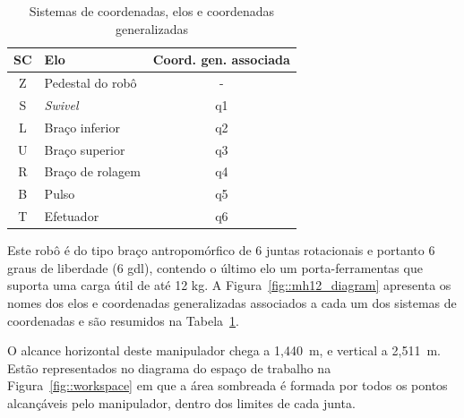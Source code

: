\begin{table}[h]
\centering
\caption{Sistemas de coordenadas, elos e coordenadas generalizadas}
\label{tab::resumo_mh12}
\begin{tabular}{@{}clc@{}}
\toprule
SC & Elo              & \multicolumn{1}{l}{Coord. gen. associada} \\ \midrule
Z  & Pedestal do robô & -                                         \\
S  & \textit{Swivel}  & q1                                        \\
L  & Braço inferior   & q2                                        \\
U  & Braço superior   & q3                                        \\
R  & Braço de rolagem & q4                                        \\
B  & Pulso            & q5                                        \\
T  & Efetuador        & q6                                        \\ \bottomrule
\end{tabular}
\end{table}

Este robô é do tipo braço antropomórfico de 6 juntas rotacionais e portanto 6
graus de liberdade (6 gdl), contendo o último elo um porta-ferramentas que
suporta uma carga útil de até 12 kg. A Figura~\ref{fig::mh12_diagram} apresenta
os nomes dos elos e coordenadas generalizadas associados a cada um dos sistemas
de coordenadas e são resumidos na Tabela~\ref{tab::resumo_mh12}.

O alcance horizontal deste manipulador chega a 1,440~m, e vertical a
2,511~m. Estão representados no diagrama do espaço de trabalho na
Figura~\ref{fig::workspace} em que a área sombreada é formada por todos os
pontos alcançáveis pelo manipulador, dentro dos limites de cada junta.

